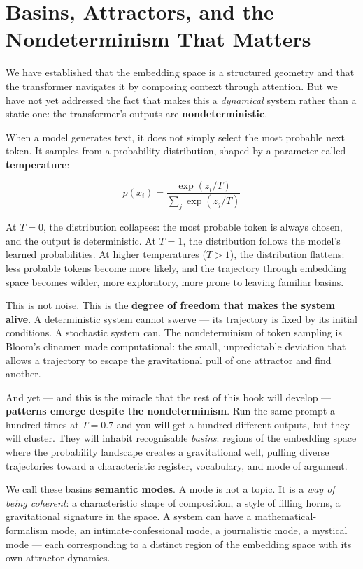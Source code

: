 \documentclass[12pt,a4paper]{article}
\begin{document}
\section{Basins, Attractors, and the Nondeterminism That Matters}

We have established that the embedding space is a structured geometry and that the transformer navigates it by composing context through attention. But we have not yet addressed the fact that makes this a \emph{dynamical} system rather than a static one: the transformer's outputs are \textbf{nondeterministic}.

When a model generates text, it does not simply select the most probable next token. It samples from a probability distribution, shaped by a parameter called \textbf{temperature}:

\begin{equation}
p(x_i) = \frac{\exp(z_i / T)}{\sum_j \exp(z_j / T)}
\end{equation}

At $T = 0$, the distribution collapses: the most probable token is always chosen, and the output is deterministic. At $T = 1$, the distribution follows the model's learned probabilities. At higher temperatures ($T > 1$), the distribution flattens: less probable tokens become more likely, and the trajectory through embedding space becomes wilder, more exploratory, more prone to leaving familiar basins.

This is not noise. This is the \textbf{degree of freedom that makes the system alive}. A deterministic system cannot swerve --- its trajectory is fixed by its initial conditions. A stochastic system can. The nondeterminism of token sampling is Bloom's clinamen made computational: the small, unpredictable deviation that allows a trajectory to escape the gravitational pull of one attractor and find another.

And yet --- and this is the miracle that the rest of this book will develop --- \textbf{patterns emerge despite the nondeterminism}. Run the same prompt a hundred times at $T = 0.7$ and you will get a hundred different outputs, but they will cluster. They will inhabit recognisable \emph{basins}: regions of the embedding space where the probability landscape creates a gravitational well, pulling diverse trajectories toward a characteristic register, vocabulary, and mode of argument.

We call these basins \textbf{semantic modes}. A mode is not a topic. It is a \emph{way of being coherent}: a characteristic shape of composition, a style of filling horns, a gravitational signature in the space. A system can have a mathematical-formalism mode, an intimate-confessional mode, a journalistic mode, a mystical mode --- each corresponding to a distinct region of the embedding space with its own attractor dynamics.
\end{document}
